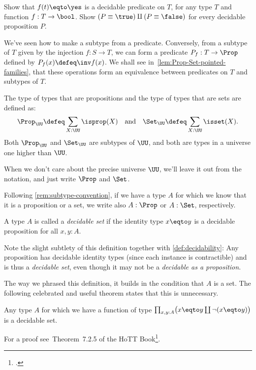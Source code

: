 \begin{xca}\label{xca:decidability}
Show that $f(t) \eqto \yes$ is a decidable predicate on $T$,
for any type $T$ and function $f:T\to\bool$.
Show $(P\equiv\true)\amalg(P\equiv\false)$ for every decidable
proposition $P$.
\end{xca}
We've seen how to make a subtype from a predicate.
Conversely, from a subtype of $T$ given by the injection
$f : S \to T$,
we can form a predicate $P_f : T \to \Prop$ defined by $P_f(x) \defeq \inv f(x)$.
We shall see in~\cref{lem:Prop-Set-pointed-families},
that these operations form an equivalence
between predicates on $T$ and subtypes of $T$.

\begin{definition}\label{def:Prop-Set}
The type of types that are propositions and the
type of types that are sets are defined as:
\[\Prop_\UU\defeq \sum_{X:\UU}\isprop(X)\quad
\text{and}\quad\Set_\UU\defeq \sum_{X:\UU}\isset(X).\]
Both $\Prop_\UU$ and $\Set_\UU$ are subtypes of $\UU$, and
both are types in a universe one higher than $\UU$.
\end{definition}
When we don't care about the precise universe $\UU$,
we'll leave it out from the notation,
and just write $\Prop$ and $\Set$.

Following \cref{rem:subtype-convention},
if we have a type $A$ for which we know that it is a proposition or a set,
we write also $A : \Prop$ or $A : \Set$, respectively.

\begin{definition}\label{def:decidable-set}
  A type $A$ is called a \emph{decidable set} if the identity type $x \eqto y$
  is a decidable proposition for all $x,y:A$.
\end{definition}
Note the slight subtlety of this definition together with
\cref{def:decidability}: Any proposition has decidable identity types
(since each instance is contractible) and is thus a \emph{decidable set},
even though it may not be a \emph{decidable as a proposition}.

The way we phrased this definition, it builds in the condition that $A$ is a set.
The following celebrated and useful theorem states that this is unnecessary.
\begin{theorem}[Hedberg]\label{thm:hedberg}
  Any type $A$ for which we have a function of type
  $\prod_{x,y:A}\bigl(x \eqto y \coprod \lnot(x \eqto y)\bigr)$
  is a decidable set.
\end{theorem}
For a proof see~Theorem~7.2.5 of the HoTT Book\footcite{hottbook}.

